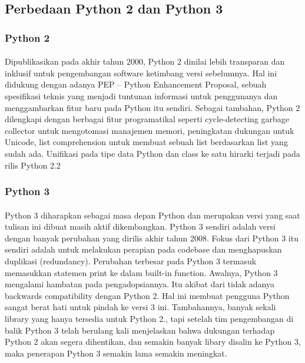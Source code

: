 \subsection{Perbedaan Python 2 dan Python 3}
\subsubsection{Python 2}
\paragraph{}
Dipublikasikan pada akhir tahun 2000, Python 2 dinilai lebih transparan dan inklusif untuk pengembangan software ketimbang versi sebelumnya. Hal ini didukung dengan adanya PEP – Python Enhancement Proposal, sebuah spesifikasi teknis yang menjadi tuntunan informasi untuk penggunanya dan menggambarkan fitur baru pada Python itu sendiri. Sebagai tambahan, Python 2 dilengkapi dengan berbagai fitur programatikal seperti cycle-detecting garbage collector untuk mengotomasi manajemen memori, peningkatan dukungan untuk Unicode, list comprehension untuk membuat sebuah list berdasarkan list yang sudah ada. Unifikasi pada tipe data Python dan class ke satu hirarki terjadi pada rilis Python 2.2
\subsubsection{Python 3}
\paragraph{}
Python 3 diharapkan sebagai masa depan Python dan merupakan versi yang saat tulisan ini dibuat masih aktif dikembangkan. Python 3 sendiri adalah versi dengan banyak perubahan yang dirilis akhir tahun 2008. Fokus dari Python 3 itu sendiri adalah untuk melakukan perapian pada codebase dan menghapuskan duplikasi (redundancy). Perubahan terbesar pada Python 3 termasuk memasukkan statemen print ke dalam built-in function. Awalnya, Python 3 mengalami hambatan pada pengadopsiannya. Itu akibat dari tidak adanya backwards compatibility dengan Python 2. Hal ini membuat pengguna Python sangat berat hati untuk pindah ke versi 3 ini. Tambahannya, banyak sekali library yang hanya tersedia untuk Python 2., tapi setelah tim pengembangan di balik Python 3 telah berulang kali menjelaskan bahwa dukungan terhadap Python 2 akan segera dihentikan, dan semakin banyak libary disalin ke Python 3, maka penerapan Python 3 semakin lama semakin meningkat.
